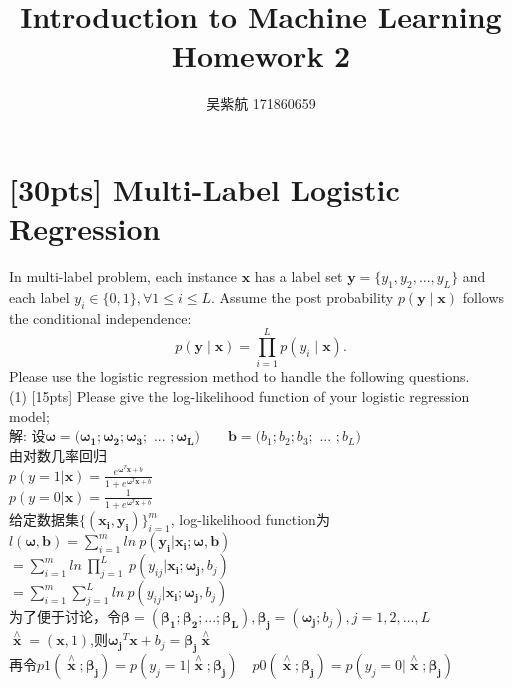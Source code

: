 \documentclass{article}
\title{Introduction to Machine Learning\\Homework 2}
\author{吴紫航 171860659}
\date{}
\begin{document}
	\maketitle
	\section{[30pts] Multi-Label Logistic Regression}
    In multi-label problem, each instance $\bm{x}$ has a label set $\bm{y}=\{y_1,y_2,...,y_L\}$ and each label $y_i\in\{0,1\}, \forall 1 \leq i \leq L$. Assume the post probability $p(\bm{y} \mid \bm{x})$ follows the conditional independence:\\
    \begin{equation}
    p(\bm{y} \mid \bm{x})=\prod\limits_{i=1}^L p(y_i \mid \bm{x}).
    \end{equation}
    Please use the logistic regression method to handle the following questions.\\
    (1) [15pts] Please give the log-likelihood function of your logistic regression model;\\
解:
设$\bm{\omega}=(\bm{\omega_1};\bm{\omega_2};\bm{\omega_3};$ ... $;\bm{\omega_L})$\ \ \ \ $\bm{b}=(b_1;b_2;b_3;$ ... $;b_L)$\\
由对数几率回归\\
$p(y=1|\bm{x})=\frac{e^{\bm{\omega}^T\bm{x}+b}}{1+e^{\bm{\omega}^T\bm{x}+b}}$\\
$p(y=0|\bm{x})=\frac{1}{1+e^{\bm{\omega}^T\bm{x}+b}}$\\
给定数据集$\{(\bm{x_i},\bm{y_i})\}_{i=1}^m$,  log-likelihood function为\\
$l(\bm{\omega},\bm{b})=\sum\limits_{i=1}^m{ln\ p(\bm{y_i}|\bm{x_i};\bm{\omega},\bm{b})}$\\$=\sum\limits_{i=1}^m{ln\ \prod\limits_{j=1}^L{\ p(y_{ij}|\bm{x_i};\bm{\omega_j},b_j)}}$\\$=\sum\limits_{i=1}^m{\sum\limits_{j=1}^L{ln\ p(y_{ij}|\bm{x_i};\bm{\omega_j},b_j)}}$\\
为了便于讨论，令$\bm{\beta}=(\bm{\beta_1};\bm{\beta_2};...;\bm{\beta_L}),\bm{\beta_j}=(\bm{\omega_j};b_j),j=1,2,...,L$\\
$\mathop{\bm{x}}\limits^{\wedge}=(\bm{x},1)$,则$\bm{\omega_j}^{T}\bm{x}+b_j=\bm{\beta_j}\mathop{\bm{x}}\limits^{\wedge}$\\
再令$p1(\mathop{\bm{x}}\limits^{\wedge};\bm{\beta_j})=p(y_j=1|\mathop{\bm{x}}\limits^{\wedge};\bm{\beta_j})$\ \ 
$p0(\mathop{\bm{x}}\limits^{\wedge};\bm{\beta_j})=p(y_j=0|\mathop{\bm{x}}\limits^{\wedge};\bm{\beta_j})$\\
\end{document}
